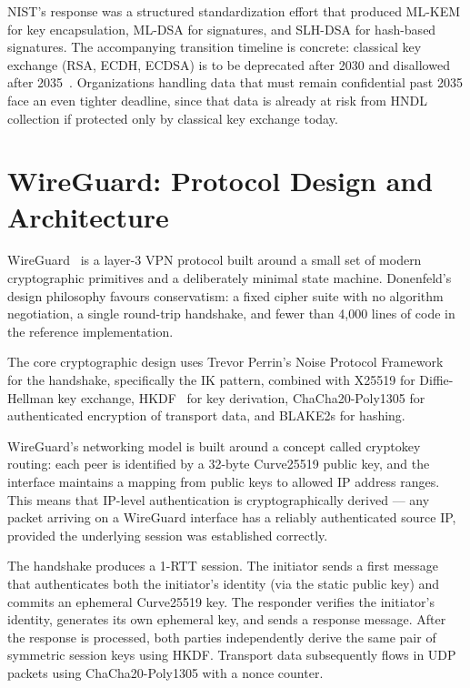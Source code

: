NIST's response was a structured standardization effort that produced ML-KEM for key encapsulation, ML-DSA for signatures, and SLH-DSA for hash-based signatures. The accompanying transition timeline is concrete: classical key exchange (RSA, ECDH, ECDSA) is to be deprecated after 2030 and disallowed after 2035~\cite{nistir8547}. Organizations handling data that must remain confidential past 2035 face an even tighter deadline, since that data is already at risk from HNDL collection if protected only by classical key exchange today.

\section{WireGuard: Protocol Design and Architecture}

WireGuard~\cite{donenfeld2017wireguard} is a layer-3 VPN protocol built around a small set of modern cryptographic primitives and a deliberately minimal state machine. Donenfeld's design philosophy favours conservatism: a fixed cipher suite with no algorithm negotiation, a single round-trip handshake, and fewer than 4,000 lines of code in the reference implementation.

The core cryptographic design uses Trevor Perrin's Noise Protocol Framework~\cite{noise-protocol} for the handshake, specifically the IK pattern, combined with X25519 for Diffie-Hellman key exchange, HKDF~\cite{rfc5869} for key derivation, ChaCha20-Poly1305 for authenticated encryption of transport data, and BLAKE2s for hashing.

WireGuard's networking model is built around a concept called cryptokey routing: each peer is identified by a 32-byte Curve25519 public key, and the interface maintains a mapping from public keys to allowed IP address ranges. This means that IP-level authentication is cryptographically derived — any packet arriving on a WireGuard interface has a reliably authenticated source IP, provided the underlying session was established correctly.

The handshake produces a 1-RTT session. The initiator sends a first message that authenticates both the initiator's identity (via the static public key) and commits an ephemeral Curve25519 key. The responder verifies the initiator's identity, generates its own ephemeral key, and sends a response message. After the response is processed, both parties independently derive the same pair of symmetric session keys using HKDF. Transport data subsequently flows in UDP packets using ChaCha20-Poly1305 with a nonce counter.

